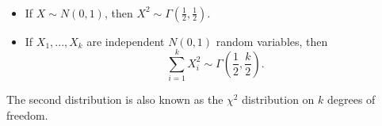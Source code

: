 \begin{prop} $ $

  \begin{itemize}
    \item If $X \sim N(0,1)$, then $X^2 \sim \Gamma( \frac{1}{2}, \frac{1}{2})$.
    \item If $X_1,...,X_k$ are independent $N(0,1)$ random variables, then
      \[\sum_{i=1}^k X_i^2 \sim \Gamma( \frac{1}{2}, \frac{k}{2}).\]
  \end{itemize}

  The second distribution is also known as the $\chi^2$ distribution on $k$ degrees of freedom.
    
\end{prop}
